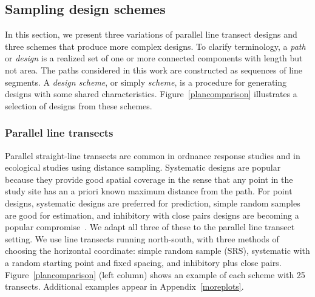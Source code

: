 \documentclass[review]{elsarticle}
\begin{document}
\subsection{Sampling design schemes}
\label{methodschemes}

In this section, we present three variations of parallel line transect designs
and three schemes that produce more complex designs. To clarify terminology, a
\emph{path} or \emph{design} is a realized set of one or more connected
components with length but not area. The paths considered in this work are
constructed as sequences of line segments. A \emph{design scheme}, or simply
\emph{scheme}, is a procedure for generating designs with some shared
characteristics. Figure~\ref{plancomparison} illustrates a selection of designs
from these schemes.


\subsubsection{Parallel line transects}

Parallel straight-line transects are common in ordnance response studies and in
ecological studies using distance sampling. Systematic designs are popular
because they provide good spatial coverage in the sense that any point in the
study site has an a priori known maximum distance from the path. For point
designs, systematic designs are preferred for prediction, simple random samples
are good for estimation, and inhibitory with close pairs designs are becoming a
popular compromise~\citep{chipetaetal2017}. We adapt all three of these to the
parallel line transect setting. We use line transects running north-south, with
three methods of choosing the horizontal coordinate: simple random sample
(SRS), systematic with a random starting point and fixed spacing, and
inhibitory plus close pairs. Figure~\ref{plancomparison} (left column) shows an
example of each scheme with 25 transects. Additional examples appear in
Appendix~\ref{moreplots}.

\end{document}
